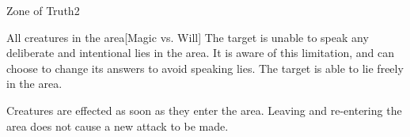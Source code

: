 \begin{spellsection}{Zone of Truth}{2}
\spelldur \durmed
\begin{spelltargets}{All creatures in the area}[Magic vs. Will]
    \spellsuccess The target is unable to speak any deliberate and intentional lies in the area. It is aware of this limitation, and can choose to change its answers to avoid speaking lies.
    \spellfailure The target is able to lie freely in the area.
\end{spelltargets}
\spellnotes Creatures are effected as soon as they enter the area. Leaving and re-entering the area does not cause a new attack to be made.
\end{spellsection}
